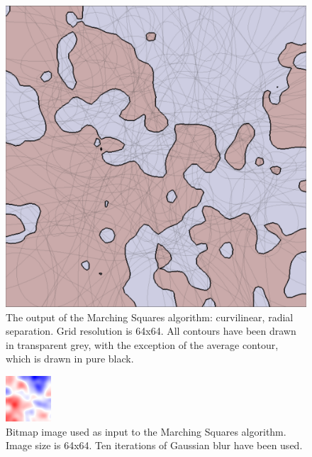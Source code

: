 \documentclass[12pt]{article}
\begin{document}
\begin{figure} 
\centering
  \includegraphics[width = 3 in]{1blur.png}
  \caption{The output of the Marching Squares algorithm: curvilinear, radial separation. 
Grid resolution is 64x64.
All contours have been drawn in transparent grey, with the exception of the average contour, which is drawn in pure black.
}
\end{figure}




\begin{figure} 
\centering
  \includegraphics[width = 3 in]{image_avg_10blur.png}
  \caption{Bitmap image used as input to the Marching Squares algorithm.
Image size is 64x64.
Ten iterations of Gaussian blur have been used.
}
\end{figure}
	
\end{document}
